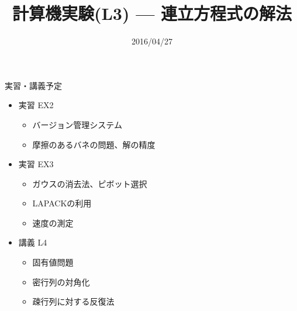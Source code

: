 \documentclass[dvipdfmx]{beamer}
\title{計算機実験(L3) --- 連立方程式の解法}
\date{2016/04/27}
\begin{document}
\begin{frame}
  \titlepage
  \tableofcontents
\end{frame}






\section{}
\begin{frame}[t,fragile]{実習・講義予定}
  \begin{itemize}
    \setlength{\itemsep}{1em}
  \item 実習 EX2
    \begin{itemize}
    \item バージョン管理システム
    \item 摩擦のあるバネの問題、解の精度
    \end{itemize}
  \item 実習 EX3
    \begin{itemize}
    \item ガウスの消去法、ピボット選択
    \item LAPACKの利用
    \item 速度の測定
    \end{itemize}
  \item 講義 L4
    \begin{itemize}
    \item 固有値問題
    \item 密行列の対角化
    \item 疎行列に対する反復法
    \end{itemize}
  \end{itemize}
\end{frame}
\end{document}
